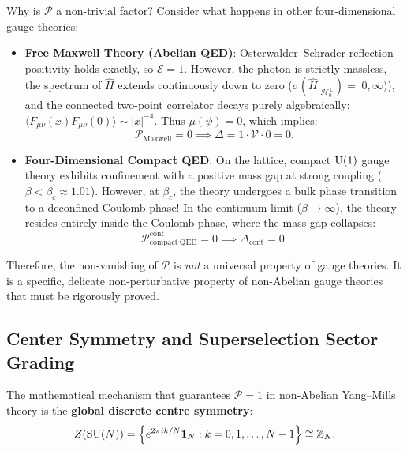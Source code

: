 Why is $\mathcal{P}$ a non-trivial factor? Consider what happens in other four-dimensional gauge theories:
\begin{itemize}
    \item \textbf{Free Maxwell Theory (Abelian QED)}: Osterwalder--Schrader reflection positivity holds exactly, so $\mathcal{E} = 1$. However, the photon is strictly massless, the spectrum of $\hat{H}$ extends continuously down to zero ($\sigma(\hat{H}|_{\mathcal{H}_0^\perp}) = [0, \infty)$), and the connected two-point correlator decays purely algebraically: $\langle F_{\mu\nu}(x) F_{\mu\nu}(0) \rangle \sim |x|^{-4}$. Thus $\mu(\psi) = 0$, which implies:
    \begin{equation}
    \mathcal{P}_{\mathrm{Maxwell}} = 0 \implies \Delta = 1 \cdot \mathcal{V} \cdot 0 = 0.
    \end{equation}
    \item \textbf{Four-Dimensional Compact QED}: On the lattice, compact $\mathrm{U}(1)$ gauge theory exhibits confinement with a positive mass gap at strong coupling ($\beta < \beta_c \approx 1.01$). However, at $\beta_c$, the theory undergoes a bulk phase transition to a deconfined Coulomb phase! In the continuum limit ($\beta \to \infty$), the theory resides entirely inside the Coulomb phase, where the mass gap collapses:
    \begin{equation}
    \mathcal{P}_{\mathrm{compact\ QED}}^{\mathrm{cont}} = 0 \implies \Delta_{\mathrm{cont}} = 0.
    \end{equation}
\end{itemize}

Therefore, the non-vanishing of $\mathcal{P}$ is \emph{not} a universal property of gauge theories. It is a specific, delicate non-perturbative property of non-Abelian gauge theories that must be rigorously proved.

\subsection{Center Symmetry and Superselection Sector Grading}
\label{subsec:centre_symmetry_grading_ch8}

The mathematical mechanism that guarantees $\mathcal{P} = 1$ in non-Abelian Yang--Mills theory is the \textbf{global discrete centre symmetry}:
\begin{equation}
Z(\mathrm{SU}(N)) = \left\{ e^{2\pi i k / N} \mathbf{1}_N : k = 0, 1, \dots, N-1 \right\} \cong \mathbb{Z}_N.
\end{equation}

